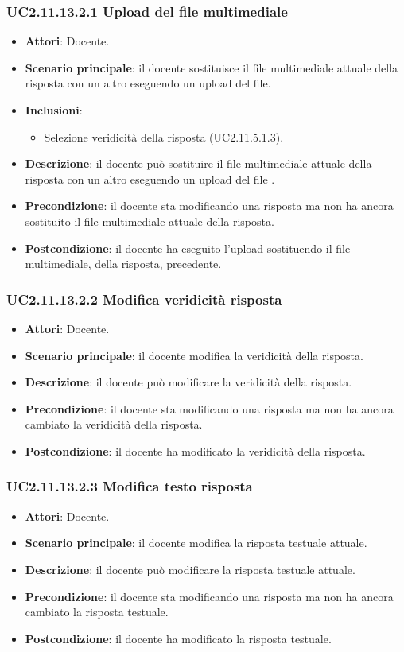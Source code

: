 \subsubsection{UC2.11.13.2.1 Upload del file multimediale}
\begin{itemize}
\item \textbf{Attori}: Docente.
\item \textbf{Scenario principale}: il docente sostituisce il file multimediale attuale della risposta con un altro eseguendo un upload del file.
\item \textbf{Inclusioni}:
\begin{itemize}
\item Selezione veridicità della risposta (UC2.11.5.1.3).
\end{itemize}
\item \textbf{Descrizione}: il docente può sostituire il file multimediale attuale della risposta con un altro eseguendo un upload del file
.
\item \textbf{Precondizione}: il docente sta modificando una risposta ma non ha ancora sostituito il file multimediale attuale della risposta.
\item \textbf{Postcondizione}: il docente ha eseguito l'upload sostituendo il file multimediale, della risposta, precedente.
\end{itemize}
\subsubsection{UC2.11.13.2.2 Modifica veridicità risposta}
\begin{itemize}
\item \textbf{Attori}: Docente.
\item \textbf{Scenario principale}: il docente modifica la veridicità della risposta.
\item \textbf{Descrizione}: il docente può modificare la veridicità della risposta.
\item \textbf{Precondizione}: il docente sta modificando una risposta ma non ha ancora cambiato la veridicità della risposta.
\item \textbf{Postcondizione}: il docente ha modificato la veridicità della risposta.
\end{itemize}
\subsubsection{UC2.11.13.2.3 Modifica testo risposta}
\begin{itemize}
\item \textbf{Attori}: Docente.
\item \textbf{Scenario principale}: il docente modifica la risposta testuale attuale.
\item \textbf{Descrizione}: il docente può modificare la risposta testuale attuale.
\item \textbf{Precondizione}: il docente sta modificando una risposta ma non ha ancora cambiato la risposta testuale.
\item \textbf{Postcondizione}: il docente ha modificato la risposta testuale.
\end{itemize}
